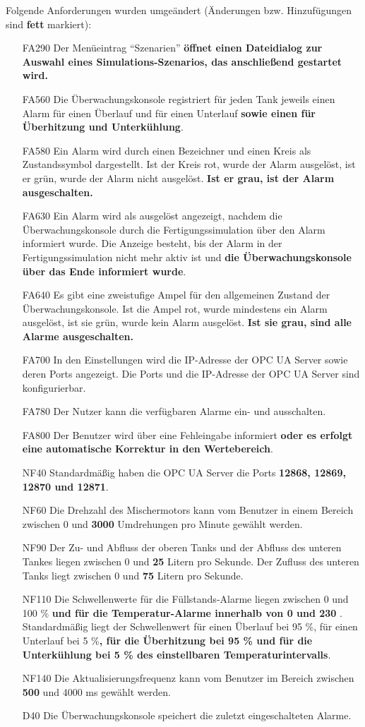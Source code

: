 \documentclass[parskip=full]{scrartcl}
\begin{document}
Folgende Anforderungen wurden umgeändert (Änderungen bzw. Hinzufügungen sind \textbf{fett} markiert):
\begin{enumerate}
	\item[FA290] Der Menüeintrag "`Szenarien"' \textbf{öffnet einen Dateidialog zur Auswahl eines Simulations-Szenarios, das anschließend gestartet wird.}
	\item[FA560] Die Überwachungskonsole registriert für jeden Tank jeweils einen Alarm für einen Überlauf und für einen Unterlauf \textbf{sowie einen für Überhitzung und Unterkühlung}.
	\item[FA580] Ein Alarm wird durch einen Bezeichner und einen Kreis als Zustandssymbol dargestellt. Ist der Kreis rot, wurde der Alarm ausgelöst, ist er grün, wurde der Alarm nicht ausgelöst. \textbf{Ist er grau, ist der Alarm ausgeschalten.}
	\item[FA630] Ein Alarm wird als ausgelöst angezeigt, nachdem die Überwachungskonsole durch die Fertigungssimulation über den Alarm informiert wurde. Die Anzeige besteht, bis der Alarm in der Fertigungssimulation nicht mehr aktiv ist und \textbf{die Überwachungskonsole über das Ende informiert wurde}.
	\item[FA640] Es gibt eine zweistufige Ampel für den allgemeinen Zustand der Überwachungskonsole. Ist die Ampel rot, wurde mindestens ein Alarm ausgelöst, ist sie grün, wurde kein Alarm ausgelöst. \textbf{Ist sie grau, sind alle Alarme ausgeschalten.}
	\item[FA700] In den Einstellungen wird die IP-Adresse der OPC UA Server sowie deren Ports angezeigt. Die Ports und die IP-Adresse der OPC UA Server sind konfigurierbar.
	\item[FA780] Der Nutzer kann die verfügbaren Alarme ein- und ausschalten.
	\item[FA800] Der Benutzer wird über eine Fehleingabe informiert \textbf{oder es erfolgt eine automatische Korrektur in den Wertebereich}.
	\item[NF40] Standardmäßig haben die OPC UA Server die Ports \textbf{12868, 12869, 12870 und 12871}.
	\item[NF60] Die Drehzahl des Mischermotors kann vom Benutzer in einem Bereich zwischen 0 und \textbf{3000} Umdrehungen pro Minute gewählt werden.
	\item[NF90] Der Zu- und Abfluss der oberen Tanks und der Abfluss des unteren Tankes liegen zwischen 0 und \textbf{25} Litern pro Sekunde. Der Zufluss des unteren Tanks liegt zwischen 0 und \textbf{75} Litern pro Sekunde.
	\item[NF110] Die Schwellenwerte für die Füllstands-Alarme liegen zwischen 0 und 100 \% \textbf{und für die Temperatur-Alarme innerhalb von 0 \textcelsius und 230 \textcelsius}. Standardmäßig liegt der Schwellenwert für einen Überlauf bei 95 \%, für einen Unterlauf bei 5 \%\textbf{, für die Überhitzung bei 95 \% und für die Unterkühlung bei 5 \% des einstellbaren Temperaturintervalls}.
	\item[NF140] Die Aktualisierungsfrequenz kann vom Benutzer im Bereich zwischen \textbf{500} und 4000 ms gewählt werden.
	\item[D40] Die Überwachungskonsole speichert die zuletzt eingeschalteten Alarme.
\end{enumerate}
\end{document}
